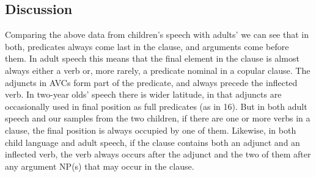 \documentclass[output=paper]{langsci/langscibook}
\begin{document}
\subsection{Discussion}

 Comparing the above data from  children’s speech with adults’ we can see that in both, predicates always come last in the clause, and arguments come before them. In adult speech this means that the final element in the clause is almost always either a verb or, more rarely, a predicate nominal in a copular clause. The adjuncts in AVCs form part of the predicate, and always precede the inflected verb. In two-year olds' speech there is wider latitude, in that adjuncts are occasionally used in
final position as full predicates (as in 16). But in both adult speech and our samples from the two children, if there are one or more verbs in a clause, the final position is always occupied by one of them. Likewise, in both child language and adult speech, if the clause contains both an adjunct and an inflected verb, the verb always occurs after the adjunct and the two of them after any argument NP(s) that may occur in the clause.
\end{document}
